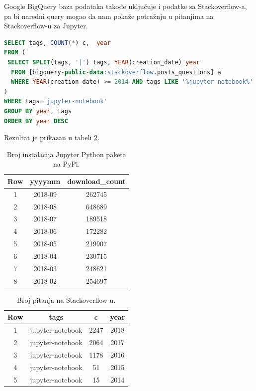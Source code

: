 \documentclass[a4paper]{article}
\begin{document}
Google BigQuery baza podataka takođe uključuje i podatke sa Stackoverflow-a, pa bi naredni query mogao da nam pokaže potražnju u pitanjima na Stackoverflow-u za Jupyter.

\begin{lstlisting}[caption={Broj pitanja na Stackoverflow-u za Jupyter},frame=single, label=simple, language=SQL]
SELECT tags, COUNT(*) c,  year
FROM (
 SELECT SPLIT(tags, '|') tags, YEAR(creation_date) year
  FROM [bigquery-public-data:stackoverflow.posts_questions] a
  WHERE YEAR(creation_date) >= 2014 AND tags LIKE '%jupyter-notebook%'
)
WHERE tags='jupyter-notebook'
GROUP BY year, tags
ORDER BY year DESC
\end{lstlisting}

Rezultat je prikazan u tabeli \ref{tab:tabela2}.

\begin{table}[h!]
\begin{center}
\caption{Broj instalacija Jupyter Python paketa na PyPi.}
\begin{tabular}{|c|c|c|} \hline
Row& yyyymm& download\_count\\ \hline
1&2018-09&262745\\
2&2018-08&648689\\
3&2018-07&189518\\
4&2018-06&172282\\
5&2018-05&219907\\
6&2018-04&230715\\
7&2018-03&248621\\
8&2018-02&254697\\ \hline
\end{tabular}
\label{tab:tabela1}
\end{center}
\end{table}

\begin{table}[h!]
\begin{center}
\caption{Broj pitanja na Stackoverflow-u.}
\begin{tabular}{|c|c|c|c|} \hline
Row& tags& c& year\\ \hline
1&jupyter-notebook&2247&2018\\
2&jupyter-notebook&2064&2017\\
3&jupyter-notebook&1178&2016\\
4&jupyter-notebook&51&2015\\
5&jupyter-notebook&15&2014\\ \hline
\end{tabular}
\label{tab:tabela2}
\end{center}
\end{table}
\end{document}
